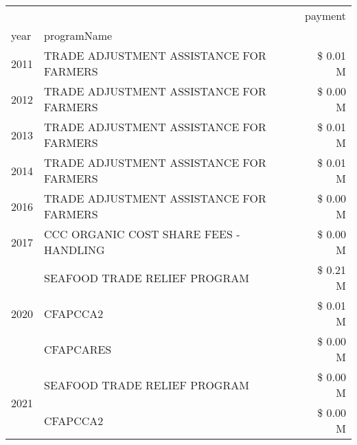 \begin{tabular}{llr}
\toprule
 &  & payment \\
year & programName &  \\
\midrule
2011 & TRADE ADJUSTMENT ASSISTANCE FOR FARMERS & \$ 0.01 M \\
\cline{1-3}
2012 & TRADE ADJUSTMENT ASSISTANCE FOR FARMERS & \$ 0.00 M \\
\cline{1-3}
2013 & TRADE ADJUSTMENT ASSISTANCE FOR FARMERS & \$ 0.01 M \\
\cline{1-3}
2014 & TRADE ADJUSTMENT ASSISTANCE FOR FARMERS & \$ 0.01 M \\
\cline{1-3}
2016 & TRADE ADJUSTMENT ASSISTANCE FOR FARMERS & \$ 0.00 M \\
\cline{1-3}
2017 & CCC ORGANIC COST SHARE FEES - HANDLING & \$ 0.00 M \\
\cline{1-3}
\multirow[t]{3}{*}{2020} & SEAFOOD TRADE RELIEF PROGRAM & \$ 0.21 M \\
 & CFAPCCA2 & \$ 0.01 M \\
 & CFAPCARES & \$ 0.00 M \\
\cline{1-3}
\multirow[t]{2}{*}{2021} & SEAFOOD TRADE RELIEF PROGRAM & \$ 0.00 M \\
 & CFAPCCA2 & \$ 0.00 M \\
\cline{1-3}
\bottomrule
\end{tabular}
